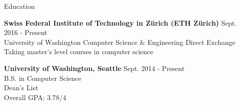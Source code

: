 \documentclass{resume} %
\begin{document}

\begin{rSection}{Education}

  {\bf Swiss Federal Institute of Technology in Z\"{u}rich (ETH Z\"{u}rich)} \hfill {Sept. 2016 - Present} \\
  University of Washington Computer Science \& Engineering Direct Exchange  \\
  Taking master's level courses in computer science

  {\bf University of Washington, Seattle} \hfill {Sept. 2014 - Present} \\
  B.S. in Computer Science \\
  Dean's List \\
  Overall GPA: 3.78/4

\end{rSection}

\end{document}

